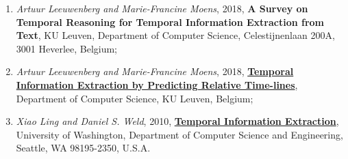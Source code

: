 \documentclass{report}
\begin{document}
\begin{enumerate}
\item \textit{Artuur Leeuwenberg and Marie-Francine Moens}, 2018, \textbf{A Survey on Temporal Reasoning for Temporal Information Extraction from Text}, KU Leuven, Department of Computer Science, Celestijnenlaan 200A, 3001 Heverlee, Belgium;

\item \textit{Artuur Leeuwenberg and Marie-Francine Moens}, 2018, \href{https://aclweb.org/anthology/D18-1155}{\textbf{Temporal Information Extraction by Predicting Relative Time-lines}}, Department of Computer Science, KU Leuven, Belgium;

\item \textit{Xiao Ling and Daniel S. Weld}, 2010, \href{https://homes.cs.washington.edu/~weld/papers/ling-aaai10.pdf}{\textbf{Temporal Information Extraction}}, University of Washington, Department of Computer Science and Engineering, Seattle, WA 98195-2350, U.S.A.
\end{enumerate}
\end{document}
